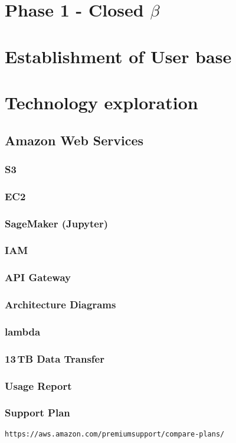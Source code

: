 \section{Phase 1 - Closed $\beta$}
\section{Establishment of User base}
\section{Technology exploration}

\subsection{Amazon Web Services}
\subsubsection{S3}
\subsubsection{EC2}
\subsubsection{SageMaker (Jupyter)}
\subsubsection{IAM}
\subsubsection{API Gateway}
\subsubsection{Architecture Diagrams}
\subsubsection{lambda}
\subsubsection{13\,TB Data Transfer}
\subsubsection{Usage Report}
\subsubsection{Support Plan}
\begin{verbatim}
https://aws.amazon.com/premiumsupport/compare-plans/
\end{verbatim}

